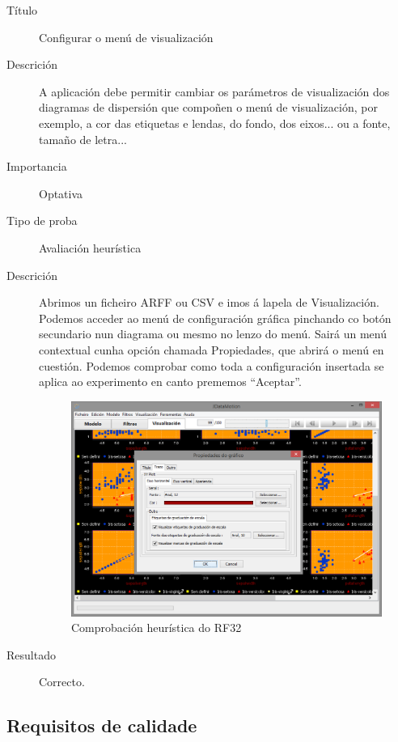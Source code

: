 \begin{description}
\item[Título] \hfill
Configurar o menú de visualización
\item[Descrición] \hfill
A aplicación debe permitir cambiar os parámetros de visualización dos diagramas de dispersión que compoñen o menú de visualización, por exemplo, a cor das etiquetas e lendas, do fondo, dos eixos... ou a fonte, tamaño de letra...
\item[Importancia] \hfill
Optativa
\item[Tipo de proba] \hfill
Avaliación heurística
\item[Descrición]
Abrimos un ficheiro ARFF ou CSV e imos á lapela de Visualización. Podemos acceder ao menú de configuración gráfica pinchando co botón secundario nun diagrama ou mesmo no lenzo do menú. Sairá un menú contextual cunha opción chamada Propiedades, que abrirá o menú en cuestión.
Podemos comprobar como toda a configuración insertada se aplica ao experimento en canto prememos ``Aceptar''.
\begin{figure}
\centering
\includegraphics[width=\textwidth,height=\textheight,keepaspectratio]{figuras/RF32}
\caption{Comprobación heurística do RF32}
\label{RF32}
\end{figure}
\item[Resultado]
Correcto.
\end{description}

\subsection{Requisitos de calidade}


